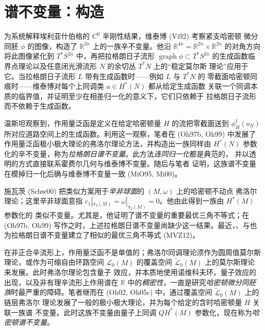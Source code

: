 \chapter{谱不变量：构造}
\label{ch:spectral-construction}

为系统解释埃利亚什伯格的 $C^0$ 辛刚性结果，维泰博 (Vi92) 考察紧支哈密顿
微分同胚 $\phi$ 的图像，构造了 $\mathbb R^{2n}$ 上的一族辛不变量。他沿
$\mathbb R^{4n}=\mathbb R^{2n}\times\mathbb R^{2n}$ 的对角方向将此图像紧化到
$T^*S^{2n}$ 中，再把拉格朗日子流形 $\operatorname{graph}\phi\subset T^*S^{2n}$
的生成函数临界点理论以及任意闭光滑流形 $N$ 的余切丛 $T^*N$ 上的“稳定莫尔斯
理论”应用于它。当拉格朗日子流形 $L$ 带有生成函数时——例如 $L$ 与 $T^*N$ 的
零截面哈密顿同痕时——维泰博对每个上同调类 $a\in H^*(N)$ 都从给定生成函数
关联一个同调本质的临界值，并证明至少在相差归一化的意义下，它们只依赖于
拉格朗日子流形而不依赖于生成函数。

温斯坦观察到，作用量泛函是定义在给定哈密顿量 $H$ 的流把零截面送到
$\phi_H^1(o_N)$ 所对应道路空间上的生成函数。利用这一观察，笔者在 (Oh97b,
Oh99) 中发展了作用量泛函极小极大理论的弗洛尔理论方法，并构造出一族同样由
$H^*(N)$ 参数化的辛不变量，称为\emph{拉格朗日谱不变量}。此方法\emph{连同归一化}都是典范的，
并以透明的方式直接联系霍费尔几何与维泰博不变量。随后\personMilinkovic{}与笔者
证明，这族谱不变量在模掉归一化后确与维泰博不变量一致 (MiO95, Mi00)。

施瓦茨 (Schw00) 把类似方案用于\emph{辛非球面}的 $(M,\omega)$ 上的哈密顿不动点
弗洛尔理论；这里辛非球面意指
$c_1|_{\pi_2(M)}=\omega|_{\pi_2(M)}=0$。他由此得到一族由 $H^*(M)$ 参数化的
类似不变量。尤其是，他证明了谱不变量的重要最优三角不等式；在 (Oh97b, Oh99)
写作之时，上述拉格朗日谱不变量尚缺少这一结果。最近，\personMonzner{}、\personVichery{}与\personZapolsky{}也为拉格朗日谱不变量建立了相似的最优三角不等式 (MVZ12)。

在非正合辛流形上，作用量泛函不是单值的；弗洛尔同调理论须作为圆周值莫尔斯
理论，或作为可缩自由环路空间 $\mathcal L_0(M)$ 的覆盖空间
$\widetilde{\mathcal L}_0(M)$ 上的莫尔斯理论来发展。此时弗洛尔理论包含量子
效应，并本质地使用诺维科夫环。量子效应的出现，以及非有理辛流形上作用谱在
$\mathbb R$ 中的\emph{稠密性}，一直是研究\emph{哈密顿微分同胚族}时最严重的障碍。笔者继而在
(Oh02, Oh05c) 中，通过覆盖空间 $\widetilde{\mathcal L}_0(M)$ 上的链层弗洛尔
理论发展了一般的极小极大理论，并为每个给定的含时哈密顿量 $H$ 关联一族谱
不变量。此时这族不变量由量子上同调 $QH^*(M)$ 参数化，现在称为\emph{哈密顿谱不变量}。







